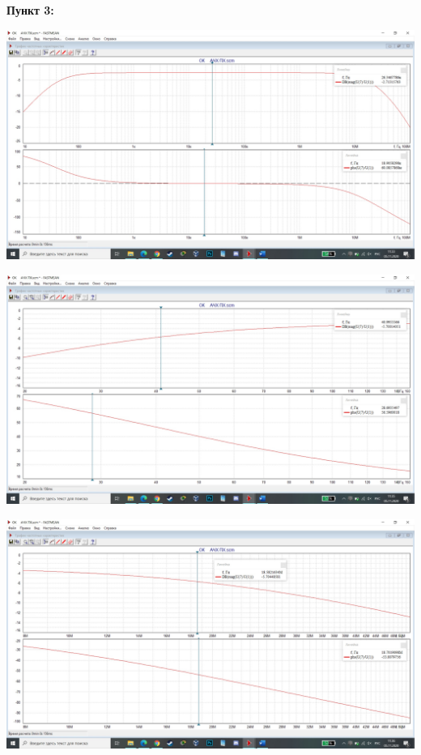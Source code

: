 \documentclass[a4paper,14pt]{extarticle}
\begin{document}
    \newpage 
    \textbf{Пункт 3:}
    \begin{center}
        \includegraphics[scale=0.25]{3.1.jpg}
    \end{center}
    \begin{center}
        \includegraphics[scale=0.25]{3.2.jpg}
    \end{center}
    \begin{center}
        \includegraphics[scale=0.25]{3.3.jpg}
    \end{center}
\end{document}
